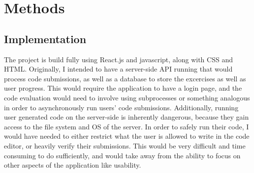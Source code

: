 \documentclass[10pt,twocolumn]{article}
\begin{document}
\section{Methods} 



\subsection{Implementation}

The project is build fully using React.js and javascript, along with CSS and HTML. Originally, I intended to have a server-side 
API running that would process code submissions, as well as a database to store the excercises as well as user progress. This 
would require the application to have a login page, and the code evaluation would need to involve using subprocesses or something 
analogous in order to asynchronously run users' code submissions. Additionally, running user generated code on the server-side 
is inherently dangerous, because they gain access to the file system and OS of the server. In order to safely run their code,
I would have needed to either restrict what the user is allowed to write in the code editor, or heavily verify their submissions. 
This would be very difficult and time consuming to do sufficiently, and would take away from the ability to focus on other aspects 
of the application like usability. 
\end{document}
